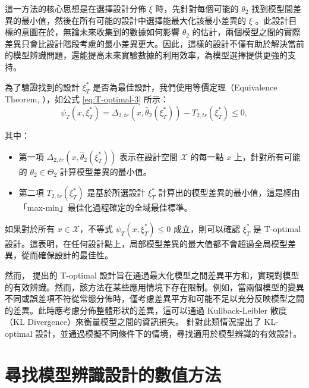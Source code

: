 \hspace*{8mm} 這一方法的核心思想是在選擇設計分佈 $\xi$ 時，先針對每個可能的 $\theta_2$ 找到模型間差異的最小值，然後在所有可能的設計中選擇能最大化該最小差異的 $\xi$ 。此設計目標的意圖在於，無論未來收集到的數據如何影響 $\theta_2$ 的估計，兩個模型之間的實際差異只會比設計階段考慮的最小差異更大。因此，這樣的設計不僅有助於解決當前的模型辨識問題，還能提高未來實驗數據的利用效率，為模型選擇提供更強的支持。

\begin{theorem}
為了驗證找到的設計 $\xi_T^\ast$ 是否為最佳設計，我們使用等價定理（Equivalence Theorem, \citep{atkinson1975design,atkinson1975optimal}），如公式 \eqref{eq:T-optimal-3} 所示：
\begin{equation}\label{eq:T-optimal-3}
\psi_T(x, \xi_T^\ast) = \Delta_{2,tr}(x, \hat{\theta}_2(\xi_T^\ast)) - T_{2,tr}(\xi_T^\ast) \leq 0,
\end{equation}

其中：
\begin{itemize}
\item 第一項 $\Delta_{2,tr}(x, \hat{\theta}_2(\xi_T^\ast))$ 表示在設計空間 $\mathcal{X}$ 的每一點 $x$ 上，針對所有可能的 $\theta_2 \in \Theta_2$ 計算模型差異的最小值。

\item 第二項 $T_{2,tr}(\xi_T^\ast)$ 是基於所選設計 $\xi_T^\ast$ 計算出的模型差異的最小值，這是經由「max-min」最佳化過程確定的全域最佳標準。
\end{itemize}
\end{theorem}

\hspace*{8mm} 如果對於所有 $x \in \mathcal{X}$，不等式 $\psi_T(x, \xi_T^\ast) \leq 0$ 成立，則可以確認 $\xi_T^\ast$ 是 T-optimal 設計。這表明，在任何設計點上，局部模型差異的最大值都不會超過全局模型差異，從而確保設計的最佳性。

\hspace*{8mm} 然而， \cite{atkinson1975design,atkinson1975optimal} 提出的 T-optimal 設計旨在通過最大化模型之間差異平方和，實現對模型的有效辨識。然而，該方法在某些應用情境下存在限制。例如，當兩個模型的變異不同或誤差項不符從常態分佈時，僅考慮差異平方和可能不足以充分反映模型之間的差異。此時應考慮分佈整體形狀的差異，這可以通過 Kullback-Leibler 散度（KL Divergence）來衡量模型之間的資訊損失。 \cite{lopez2007optimal} 針對此類情況提出了 KL-optimal 設計，並通過模擬不同條件下的情境，尋找適用於模型辨識的有效設計。

\section{尋找模型辨識設計的數值方法}

